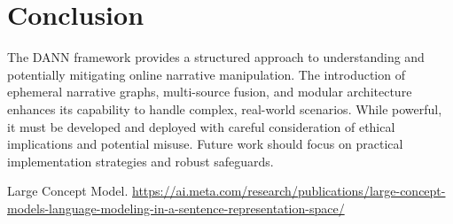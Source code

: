 \documentclass[12pt, a4paper]{article}
\begin{document}
\section{Conclusion}
The DANN framework provides a structured approach to understanding and potentially mitigating online narrative manipulation. The introduction of ephemeral narrative graphs, multi-source fusion, and modular architecture enhances its capability to handle complex, real-world scenarios. While powerful, it must be developed and deployed with careful consideration of ethical implications and potential misuse. Future work should focus on practical implementation strategies and robust safeguards.

\begin{thebibliography}{9}
    Large Concept Model. 
    \href{https://ai.meta.com/research/publications/large-concept-models-language-modeling-in-a-sentence-representation-space/}{https://ai.meta.com/research/publications/large-concept-models-language-modeling-in-a-sentence-representation-space/}
\end{thebibliography}
\end{document}
